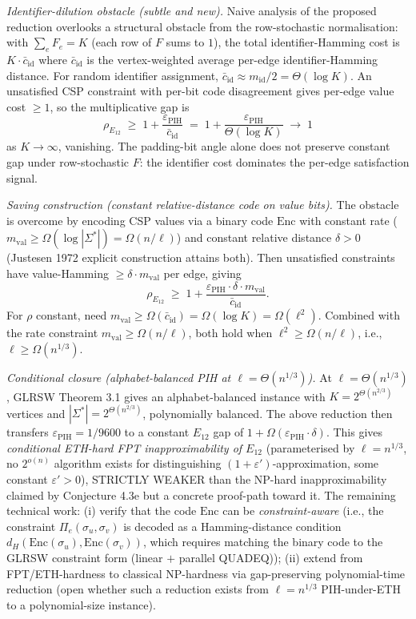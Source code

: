 \documentclass[
]{article}
\begin{document}
\begin{itemize}
  \emph{Identifier-dilution obstacle (subtle and new).} Naive analysis
  of the proposed reduction overlooks a structural obstacle from the
  row-stochastic normalisation: with $\sum_e F_e = K$ (each row of $F$
  sums to $1$), the total identifier-Hamming cost is $K \cdot \bar{c}_{\mathrm{id}}$
  where $\bar{c}_{\mathrm{id}}$ is the vertex-weighted average per-edge
  identifier-Hamming distance. For random identifier assignment,
  $\bar{c}_{\mathrm{id}} \approx m_{\mathrm{id}}/2 = \Theta(\log K)$.
  An unsatisfied CSP constraint with per-bit code disagreement gives
  per-edge value cost $\geq 1$, so the multiplicative gap is
  \[
  \rho_{E_{12}} \;\geq\; 1 + \frac{\varepsilon_{\mathrm{PIH}}}{\bar{c}_{\mathrm{id}}}
  \;=\; 1 + \frac{\varepsilon_{\mathrm{PIH}}}{\Theta(\log K)} \;\to\; 1
  \]
  as $K \to \infty$, vanishing. The padding-bit angle alone does not
  preserve constant gap under row-stochastic $F$: the identifier cost
  dominates the per-edge satisfaction signal.

  \emph{Saving construction (constant relative-distance code on value
  bits).} The obstacle is overcome by encoding CSP values via a
  binary code $\mathrm{Enc}$ with constant rate ($m_{\mathrm{val}}
  \geq \Omega(\log |\Sigma^*|) = \Omega(n/\ell)$) and constant
  relative distance $\delta > 0$ (Justesen 1972 explicit construction
  attains both). Then unsatisfied constraints have value-Hamming
  $\geq \delta \cdot m_{\mathrm{val}}$ per edge, giving
  \[
  \rho_{E_{12}} \;\geq\; 1 + \frac{\varepsilon_{\mathrm{PIH}} \cdot \delta \cdot m_{\mathrm{val}}}{\bar{c}_{\mathrm{id}}}.
  \]
  For $\rho$ constant, need $m_{\mathrm{val}} \geq \Omega(\bar{c}_{\mathrm{id}})
  = \Omega(\log K) = \Omega(\ell^2)$. Combined with the rate constraint
  $m_{\mathrm{val}} \geq \Omega(n/\ell)$, both hold when $\ell^2 \geq
  \Omega(n/\ell)$, i.e., $\ell \geq \Omega(n^{1/3})$.

  \emph{Conditional closure (alphabet-balanced PIH at $\ell = \Theta(n^{1/3})$).}
  At $\ell = \Theta(n^{1/3})$, GLRSW Theorem 3.1 gives an alphabet-balanced
  instance with $K = 2^{\Theta(n^{2/3})}$ vertices and $|\Sigma^*|
  = 2^{\Theta(n^{2/3})}$, polynomially balanced. The above reduction
  then transfers $\varepsilon_{\mathrm{PIH}} = 1/9600$ to a constant
  $E_{12}$ gap of $1 + \Omega(\varepsilon_{\mathrm{PIH}} \cdot \delta)$.
  This gives \emph{conditional ETH-hard FPT inapproximability of
  $E_{12}$} (parameterised by $\ell = n^{1/3}$, no $2^{o(n)}$ algorithm
  exists for distinguishing $(1+\varepsilon')$-approximation, some
  constant $\varepsilon' > 0$), STRICTLY WEAKER than the NP-hard
  inapproximability claimed by Conjecture 4.3e but a concrete proof-path
  toward it. The remaining technical work: (i) verify that the code
  $\mathrm{Enc}$ can be \emph{constraint-aware} (i.e., the constraint
  $\Pi_e(\sigma_u, \sigma_v)$ is decoded as a Hamming-distance condition
  $d_H(\mathrm{Enc}(\sigma_u), \mathrm{Enc}(\sigma_v))$, which requires
  matching the binary code to the GLRSW constraint form
  (linear $+$ parallel QUADEQ)); (ii) extend from FPT/ETH-hardness
  to classical NP-hardness via gap-preserving polynomial-time reduction
  (open whether such a reduction exists from $\ell = n^{1/3}$
  PIH-under-ETH to a polynomial-size instance).


\end{itemize}
\end{document}
